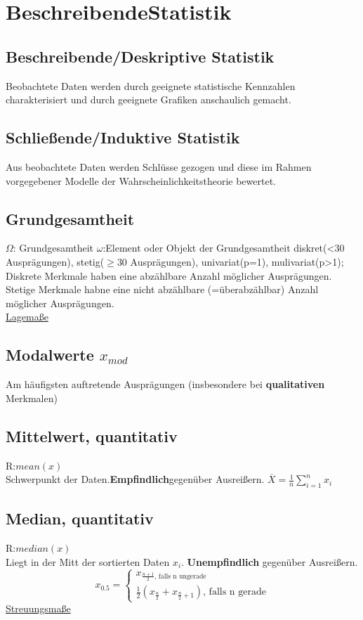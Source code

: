 \section{BeschreibendeStatistik}
    \subsection{Beschreibende/Deskriptive Statistik}
    Beobachtete Daten werden durch geeignete statistische Kennzahlen charakterisiert und durch geeignete Grafiken anschaulich gemacht.
    \subsection{Schließende/Induktive Statistik}
    Aus beobachtete Daten werden Schlüsse gezogen und diese im Rahmen vorgegebener Modelle der Wahrscheinlichkeitstheorie bewertet.
    \subsection{Grundgesamtheit}
    $\Omega$: Grundgesamtheit
    $\omega$:Element oder Objekt der Grundgesamtheit
    diskret(<30 Ausprägungen), stetig($\geq$30 Ausprägungen), univariat(p=1), mulivariat(p>1); Diskrete Merkmale haben eine abzählbare Anzahl möglicher Ausprägungen. Stetige Merkmale habne eine nicht abzählbare (=überabzählbar) Anzahl möglicher Ausprägungen.\\
    \underline{Lagemaße}
    \subsection{Modalwerte $x_{mod}$}
    Am häufigsten auftretende Ausprägungen (insbesondere bei \textbf{qualitativen} Merkmalen)
    \subsection{Mittelwert, quantitativ}
    R:$mean(x)$\\
    Schwerpunkt der Daten.\textbf{Empfindlich}gegenüber Ausreißern.
    $\overline{X} = \frac{1}{n} \sum_{i=1}^{n} x_{i}$
    \subsection{Median, quantitativ}
    R:$median(x)$\\
    Liegt in der Mitt der sortierten Daten $x_{i}$. \textbf{Unempfindlich} gegenüber Ausreißern.
    \begin{equation*}
      x_{0.5} =
        \begin{cases}
        	x_{\frac{n+1}{2} \text{, falls n ungerade}}\\
        	\frac{1}{2}(x_{\frac{n}{2}} + x_{\frac{n}{2}+1}) \text{, falls n gerade}
        \end{cases}
    \end{equation*}
  \underline{Streuungsmaße}

